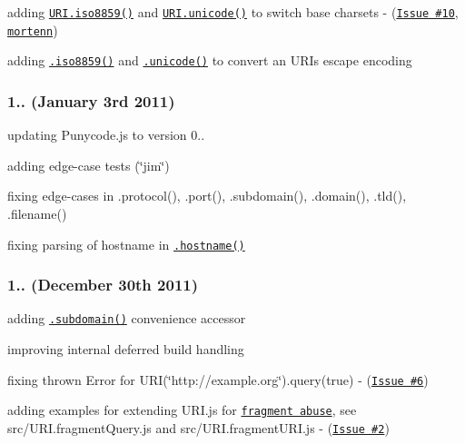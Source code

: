 \begin{DoxyItemize}
\item adding \href{http://medialize.github.io/URI.js/docs.html#static-iso8859}{\tt {\ttfamily U\+R\+I.\+iso8859()}} and \href{http://medialize.github.io/URI.js/docs.html#static-unicode}{\tt {\ttfamily U\+R\+I.\+unicode()}} to switch base charsets -\/ (\href{https://github.com/medialize/URI.js/issues/10}{\tt Issue \#10}, \href{https://github.com/}{\tt mortenn})
\item adding \href{http://medialize.github.io/URI.js/docs.html#iso8859}{\tt {\ttfamily .iso8859()}} and \href{http://medialize.github.io/URI.js/docs.html#unicode}{\tt {\ttfamily .unicode()}} to convert an U\+RI\textquotesingle{}s escape encoding
\end{DoxyItemize}

\subsubsection*{1.. (January 3rd 2011)}


\begin{DoxyItemize}
\item updating Punycode.\+js to version 0..
\item adding edge-\/case tests (\char`\"{}jim\char`\"{})
\item fixing edge-\/cases in .protocol(), .port(), .subdomain(), .domain(), .tld(), .filename()
\item fixing parsing of hostname in \href{http://medialize.github.io/URI.js/docs.html#accessors-hostname}{\tt {\ttfamily .hostname()}}
\end{DoxyItemize}

\subsubsection*{1.. (December 30th 2011)}


\begin{DoxyItemize}
\item adding \href{http://medialize.github.io/URI.js/docs.html#accessors-subdomain}{\tt {\ttfamily .subdomain()}} convenience accessor
\item improving internal deferred build handling
\item fixing thrown Error for {\ttfamily U\+RI(\char`\"{}http\+://example.\+org\char`\"{}).query(true)} -\/ (\href{https://github.com/medialize/URI.js/issues/6}{\tt Issue \#6})
\item adding examples for extending U\+R\+I.\+js for \href{http://medialize.github.io/URI.js/docs.html#fragment-abuse}{\tt fragment abuse}, see src/\+U\+R\+I.\+fragment\+Query.\+js and src/\+U\+R\+I.\+fragment\+U\+R\+I.\+js -\/ (\href{https://github.com/medialize/URI.js/issues/2}{\tt Issue \#2})
\end{DoxyItemize}

